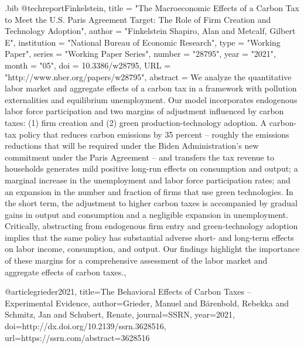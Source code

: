 \begin{filecontents}{.bib}
@techreport{Finkelstein,
 title = "The Macroeconomic Effects of a Carbon Tax to Meet the U.S. Paris Agreement Target: The Role of Firm Creation and Technology Adoption",
 author = "Finkelstein Shapiro, Alan and Metcalf, Gilbert E",
 institution = "National Bureau of Economic Research",
 type = "Working Paper",
 series = "Working Paper Series",
 number = "28795",
 year = "2021",
 month = "05",
 doi = {10.3386/w28795},
 URL = "http://www.nber.org/papers/w28795",
 abstract = {We analyze the quantitative labor market and aggregate effects of a carbon tax in a framework with pollution externalities and equilibrium unemployment. Our model incorporates endogenous labor force participation and two margins of adjustment influenced by carbon taxes: (1) firm creation and (2) green production-technology adoption.  A carbon-tax policy that reduces carbon emissions by 35 percent – roughly the emissions reductions that will be required under the Biden Administration's new commitment under the Paris Agreement – and transfers the tax revenue to households generates mild positive long-run effects on consumption and output; a marginal increase in the unemployment and labor force participation rates; and an expansion in the number and fraction of firms that use green technologies. In the short term, the adjustment to higher carbon taxes is accompanied by gradual gains in output and consumption and a negligible expansion in unemployment. Critically, abstracting from endogenous firm entry and green-technology adoption implies that the same policy has substantial adverse short- and long-term effects on labor income, consumption, and output. Our findings highlight the importance of these margins for a comprehensive assessment of the labor market and aggregate effects of carbon taxes.},
}


@article{grieder2021,
  title={The Behavioral Effects of Carbon Taxes – Experimental Evidence},
  author={Grieder, Manuel and Bärenbold, Rebekka and Schmitz, Jan and Schubert, Renate},
 journal={SSRN},
  year={2021},
  doi={http://dx.doi.org/10.2139/ssrn.3628516},
  url={https://ssrn.com/abstract=3628516 }
}






\end{filecontents}
